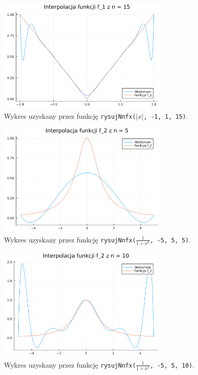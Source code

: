 \documentclass{article}
\begin{document}
\begin{figure}[H]
\centering
\includegraphics[width=0.75\textwidth]{task6_f1_n15.png}
\caption{Wykres uzyskany przez funkcję \texttt{rysujNnfx($|x|$, -1, 1, 15)}.}
\end{figure}

\begin{figure}[H]
\centering
\includegraphics[width=0.75\textwidth]{task6_f2_n5.png}
\caption{Wykres uzyskany przez funkcję \texttt{rysujNnfx($\frac{1}{1+x^2}$, -5, 5, 5)}.}
\end{figure}

\begin{figure}[H]
\centering
\includegraphics[width=0.75\textwidth]{task6_f2_n10.png}
\caption{Wykres uzyskany przez funkcję \texttt{rysujNnfx($\frac{1}{1+x^2}$, -5, 5, 10)}.}
\end{figure}
\end{document}
